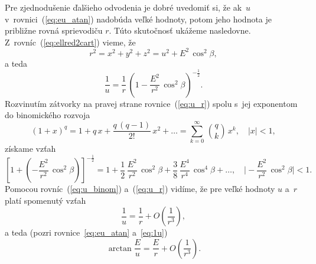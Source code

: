 \documentclass[a4paper, 12pt]{book}
\begin{document}
Pre zjednodušenie ďalšieho odvodenia je dobré uvedomiť si, že ak~$u$ 
v~rovnici~(\ref{eq:eu_atan}) nadobúda veľké hodnoty, potom jeho hodnota je 
približne rovná sprievodiču $r$.  Túto skutočnosť ukážeme nasledovne.  
Z~rovníc~(\ref{eq:ellred2cart}) vieme, že
%
\begin{equation}
r^2 = x^2 + y^2 + z^2 = u^2 + E^2 \, \cos^2\beta{,}
\end{equation}
%
a teda
%
\begin{equation}
\label{eq:u_r}
\frac{1}{u} = \frac{1}{r} \, \left( 1 - \frac{E^2}{r^2} \, \cos^2\beta 
\right)^{-\frac{1}{2}}{.}
\end{equation}
%
Rozvinutím zátvorky na pravej strane rovnice~(\ref{eq:u_r}) spolu s~jej 
exponentom do binomického rozvoja \parencite[pozri napríklad][]{Gradshteyn2007}
%
\begin{equation}
(1 + x)^q = 1 + q \, x + \frac{q \, (q - 1)}{2!} \, x^2 + \dots = \sum_{k 
= 0}^{\infty} \, \binom{q}{k} \, x^k{,} \quad | x | < 1{,}
\end{equation}
%
získame vzťah
%
\begin{equation}
\label{eq:u_binom}
\left[ 1 + \left( - \frac{E^2}{r^2} \, \cos^2\beta \right) 
\right]^{-\frac{1}{2}} = 1 + \frac{1}{2} \, \frac{E^2}{r^2} \, \cos^2\beta 
+ \frac{3}{8} \, \frac{E^4}{r^4} \, \cos^4\beta + \dots{,} \quad \bigg\lvert 
-\frac{E^2}{r^2} \, \cos^2\beta \bigg\rvert < 1{.}
\end{equation}
%
Pomocou rovníc~(\ref{eq:u_binom}) a~(\ref{eq:u_r}) vidíme, že pre veľké hodnoty 
$u$ a~$r$ platí spomenutý vzťah
%
\begin{equation}
\label{eq:1u}
\frac{1}{u} = \frac{1}{r} + O\left( \frac{1}{r^3} \right){,}
\end{equation}
%
a teda (pozri rovnice~\ref{eq:eu_atan} a~\ref{eq:1u})
%
\begin{equation}
\label{eq:arctan_eu_r}
\arctan\frac{E}{u} = \frac{E}{r} + O\left( \frac{1}{r^3} \right){.}
\end{equation}
\end{document}
